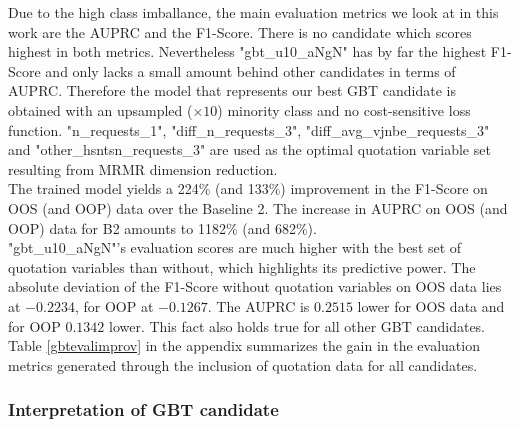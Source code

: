 \documentclass[12pt,titlepage]{article}
\begin{document}
Due to the high class imballance, the main evaluation metrics we look at in this work are the AUPRC and the F1-Score. There is no candidate which scores highest in both metrics. Nevertheless "gbt\_u10\_aNgN" has by far the highest F1-Score and only lacks a small amount behind other candidates in terms of AUPRC. Therefore the model that represents our best GBT candidate is obtained with an upsampled ($\times 10$) minority class and no cost-sensitive loss function. "n\_requests\_1", "diff\_n\_requests\_3", "diff\_avg\_vjnbe\_requests\_3" and "other\_hsntsn\_requests\_3" are used as the optimal quotation variable set resulting from MRMR dimension reduction. \\
The trained model yields a 224\% (and 133\%) improvement in the F1-Score on OOS (and OOP) data over the Baseline 2. The increase in AUPRC on OOS (and OOP) data for B2 amounts to 1182\% (and 682\%). \\
"gbt\_u10\_aNgN"'s evaluation scores are much higher with the best set of quotation variables than without, which highlights its predictive power. The absolute deviation of the F1-Score without quotation variables on OOS data lies at $-0.2234$, for OOP at $-0.1267$. The AUPRC is $0.2515$ lower for OOS data and for OOP $0.1342$ lower. This fact also holds true for all other GBT candidates. Table \ref{gbtevalimprov} in the appendix summarizes the gain in the evaluation metrics generated through the inclusion of quotation data for all candidates. \\

\subsubsection*{Interpretation of GBT candidate}
\end{document}

